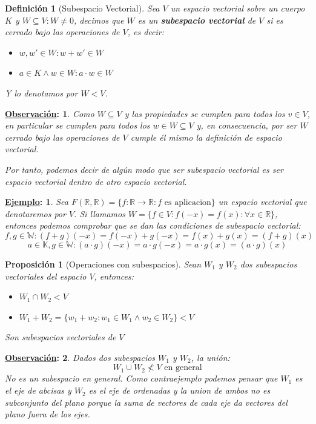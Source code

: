 \documentclass[10pt,a4paper,openright]{book}
\theoremstyle{break}
\newtheorem*{defi}{Definición}
\newtheorem*{prop}{Proposición}
\newtheorem*{obs}{\underline{Observación}:}
\newtheorem*{ej}{\underline{Ejemplo}:}
\begin{document}
\begin{defi}[Subespacio Vectorial]
Sea $V$ un espacio vectorial sobre un cuerpo $K$ y $W\subseteq V: W\neq 0$, decimos que $W$ es un \textbf{subespacio vectorial} de $V$ si es cerrado bajo las operaciones de $V$, es decir:
\begin{itemize}
\item $w, w'\in W: w+w'\in W$

\item $a\in K\wedge w\in W: a\cdot w\in W$
\end{itemize}
Y lo denotamos por $W < V$.
\end{defi}

\begin{obs}
Como $W\subseteq V$ y las propiedades se cumplen para todos los $v\in V$, en particular se cumplen para todos los $w\in W\subseteq V$ y, en consecuencia, por ser $W$ cerrado bajo las operaciones de $V$ cumple él mismo la definición de espacio vectorial.

Por tanto, podemos decir de algún modo que ser subespacio vectorial es ser espacio vectorial dentro de otro espacio vectorial.
\end{obs}

\begin{ej}
Sea $F(\mathbb R, \mathbb R)=\{f:\mathbb R\rightarrow \mathbb R : f\mbox{ es aplicacion}\}$ un espacio vectorial que denotaremos por $V$. Si llamamos $W=\{f\in V: f(-x)=f(x): \forall x \in \mathbb R\}$, entonces podemos comprobar que se dan las condiciones de subespacio vectorial:
$$f,g\in\mathbb W: (f+g)(-x)=f(-x)+g(-x)=f(x)+g(x)=(f+g)(x)$$
$$a\in \mathbb K, g\in\mathbb W: (a\cdot g)(-x)=a\cdot g(-x)=a\cdot g(x)=(a\cdot g)(x)$$
\end{ej}

\begin{prop}[Operaciones con subespacios]
Sean $W_1$ y $W_2$ dos subespacios vectoriales del espacio $V$, entonces:
\begin{itemize}
\item $W_1\cap W_2< V$
\item $W_1+W_2=\{w_1+w_2: w_1\in W_1\wedge w_2\in W_2\}< V$
\end{itemize}
Son subespacios vectoriales de $V$
\end{prop}

\begin{obs}
Dados dos subespacios $W_1$ y $W_2$, la unión:
$$W_1\cup W_2\nless V \mbox{ en general}$$
No es un subespacio en general. Como contraejemplo podemos pensar que $W_1$ es el eje de abcisas y $W_2$ es el eje de ordenadas y la union de ambos no es subconjunto del plano porque la suma de vectores de cada eje da vectores del plano fuera de los ejes.
\end{obs}
\end{document}
